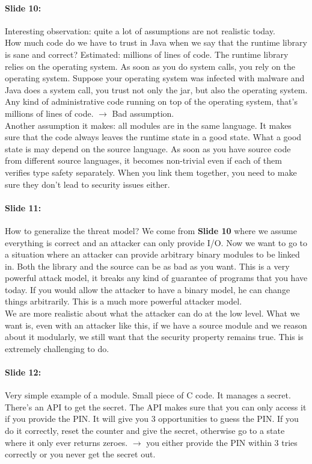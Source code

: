 \documentclass[10pt,a4paper]{report}
\begin{document}
\paragraph{Slide 10:} Interesting observation: quite a lot of assumptions are not realistic today.\\
How much code do we have to trust in Java when we say that the runtime library is sane and correct? Estimated: millions of lines of code. The runtime library relies on the operating system. As soon as you do system calls, you rely on the operating system. Suppose your operating system was infected with malware and Java does a system call, you trust not only the jar, but also the operating system. Any kind of administrative code running on top of the operating system, that's millions of lines of code. $\rightarrow$ Bad assumption.\\
Another assumption it makes: all modules are in the same language. It makes sure that the code always leaves the runtime state in a good state. What a good state is may depend on the source language. 
As soon as you have source code from different source languages, it becomes non-trivial even if each of them verifies type safety separately. When you link them together, you need to make sure they don't lead to security issues either.

\paragraph{Slide 11:} How to generalize the threat model?  We come from \textbf{Slide 10} where we assume everything is correct and an attacker can only provide I/O. Now we want to go to a situation where an attacker can provide arbitrary binary modules to be linked in. Both the library and the source can be as bad as you want. This is a very powerful attack model, it breaks any kind of guarantee of programs that you have today. If you would allow the attacker to have a binary model, he can change things arbitrarily. This is a much more powerful attacker model.\\
We are more realistic about what the attacker can do at the low level. What we want is, even with an attacker like this, if we have a source module and we reason about it modularly, we still want that the security property remains true. This is extremely challenging to do. 

\paragraph{Slide 12:} Very simple example of a module. Small piece of C code. It manages a secret. There's an API to get the secret. The API makes sure that you can only access it if you provide the PIN. It will give you 3 opportunities to guess the PIN. If you do it correctly, reset the counter and give the secret, otherwise go to a state where it only ever returns zeroes. $\rightarrow$ you either provide the PIN within 3 tries correctly or you never get the secret out. 
\end{document}
